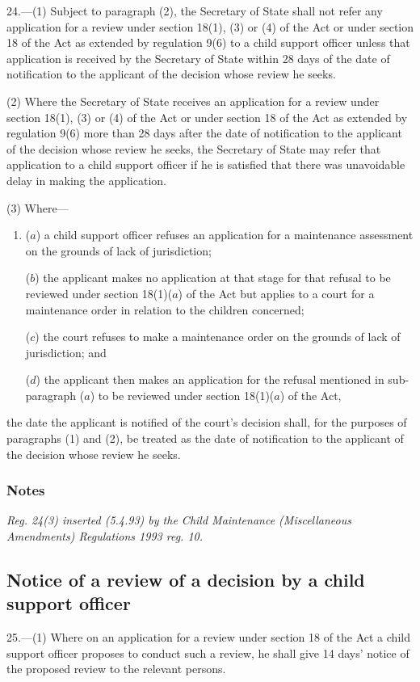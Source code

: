 \documentclass[a4paper]{article}
\newcommand\amendment[1]{\subsubsection*{Notes}{\itshape\frenchspacing\footnotesize #1 \par}}
\begin{document}
24.—(1) Subject to paragraph (2), the Secretary of State shall not refer any application for a review under section 18(1), (3) or (4) of the Act or under section 18 of the Act as extended by regulation 9(6) to a child support officer unless that application is received by the Secretary of State within 28 days of the date of notification to the applicant of the decision whose review he seeks.

(2) Where the Secretary of State receives an application for a review under section 18(1), (3) or (4) of the Act or under section 18 of the Act as extended by regulation 9(6) more than 28 days after the date of notification to the applicant of the decision whose review he seeks, the Secretary of State may refer that application to a child support officer if he is satisfied that there was unavoidable delay in making the application.

(3) Where---
\begin{enumerate}\item[]
($a$) a child support officer refuses an application for a maintenance assessment on the grounds of lack of jurisdiction;

($b$) the applicant makes no application at that stage for that refusal to be reviewed under section 18(1)($a$) of the Act but applies to a court for a maintenance order in relation to the children concerned;

($c$) the court refuses to make a maintenance order on the grounds of lack of jurisdiction; and

($d$) the applicant then makes an application for the refusal mentioned in sub-paragraph ($a$) to be reviewed under section 18(1)($a$) of the Act,
\end{enumerate}
the date the applicant is notified of the court’s decision shall, for the purposes of paragraphs (1) and (2), be treated as the date of notification to the applicant of the decision whose review he seeks.

\amendment{
Reg. 24(3) inserted (5.4.93) by the Child Maintenance (Miscellaneous Amendments) Regulations 1993 reg. 10.
}

\subsection[25. Notice of a review of a decision by a child support officer]{Notice of a review of a decision by a child support officer}

25.—(1) Where on an application for a review under section 18 of the Act a child support officer proposes to conduct such a review, he shall give 14 days' notice of the proposed review to the relevant persons.
\end{document}
